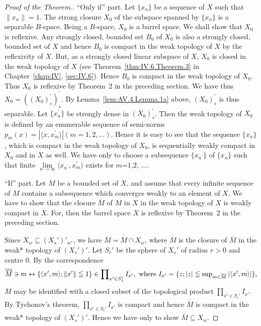 \begin{proof}[Proof of the Theorem.]
``Only if'' part. Let $\{x_{n}\}$ be a sequence of $X$ such that $\|x_{n}\|=1$. The strong closure $X_{0}$ of the subspace spanned by $\{x_{n}\}$ is a separable $B$-space. Being a $B$-space, $X_{0}$ is a barrel space. We shall show that $X_{0}$ is reflexive. Any strongly closed, bounded set $B_{0}$ of $X_{0}$ is also a strongly closed, bounded set of $X$ and hence $B_{0}$ is compact in the weak topology of $X$ by the reflexivity of $X$. But, as a strongly closed linear subspace of $X$, $X_{0}$ is closed in the weak topology of $X$ (see Theorem~\ref{thm:IV.6.Theorem.3} in Chapter~\ref{chap:IV}, \ref{sec:IV.6}). Hence $B_{0}$ is compact in the weak topology of $X_{0}$. Thus $X_{0}$ is reflexive by Theorem~\hyperref[thm:AV.3.Theorem.2]{$2$} in the preceding section. We have thus $X_{0}=((X_{0})_{s}^{\prime})_{s}^{\prime}$. By Lemma~\ref{lem:AV.4.Lemma.1a} above, $(X_{0})_{s}^{\prime}$ is thus separable. Let $\{x_{n}^{\prime}\}$ be strongly dense in $(X_{0})_{s}^{\prime}$. Then the weak topology of $X_{0}$ is defined by an enumerable sequence of semi-norms $p_{m}(x)=|\langle x,x_{m}^{\prime}\rangle|(m=1,2,\ldots)$. Hence it is easy to see that the sequence $\{x_{n}\}$, which is compact in the weak topology of $X_{0}$, is sequentially weakly compact in $X_{0}$ and in $X$ as well. We have only to choose a subsequence $\{x_{n^{\prime}}\}$ of $\{x_{n}\}$ such that finite $\lim\limits_{n\to\infty}\langle x_{n^{\prime}},x_{m}^{\prime}\rangle$ exists for $m$=$1$,$2$, $\ldots$.

``If'' part. Let $M$ be a bounded set of $X$, and assume that every infinite sequence of $M$ contains a subsequence which converges weakly to an element of $X$. We have to show that the closure $\overline{M}$ of $M$ in $X$ in the weak topology of $X$ is weakly compact in $X$. For, then the barrel space $X$ is reflexive by Theorem~\hyperref[thm:AV.3.Theorem.2]{$2$} in the preceding section. 

Since $X_w \subseteq (X_s')'_{w^*}$, we have $\overline{M} = \overline{\overline{M}} \cap X_w$, where $\overline{\overline{M}}$ is the closure of $\overline{M}$ in the weak* topology of $(X_s')'$. Let $S_r'$ be the sphere of $X_s'$ of radius $r > 0$ and centre $0$. By the correspondence 
\begin{equation}\overline {{\overline {{M}}}} \ni m \leftrightarrow \{\langle x ^{\prime}, m \rangle ; \| x ^{\prime} \| \leqq 1 \} \in \prod\limits_ {x ^{\prime} \in S _{1} ^{\prime}} I _ {x ^{\prime}}, \text{ where } I _ {x ^{\prime}} = \{z; | z | \leqq \sup\limits _ {m \in \overline {{M}}} | \langle x ^{\prime}, m \rangle | \}, \notag\end{equation}
$\overline{M}$ may be identified with a closed subset of the topological product $\prod\limits_{x' \in S_i'} I_{x'}$. By Tychonov's theorem, $\prod\limits_{x' \in S_i'} I_{x'}$ is compact and hence $\overline{\overline{M}}$ is compact in the weak* topology of $(X_s')'$. Hence we have only to show $\overline{\overline{M}} \subseteq X_w$. 


\end{proof}
